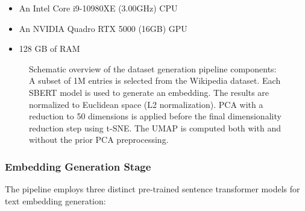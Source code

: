 \begin{itemize}
    \item An Intel Core i9-10980XE (3.00GHz) CPU
    \item An NVIDIA Quadro RTX 5000 (16GB) GPU
    \item 128 GB of RAM
\end{itemize}

\begin{figure}[!htb]
    \centering
    \caption{Schematic overview of the dataset generation pipeline components: A subset of 1M entries is selected from the Wikipedia dataset. Each SBERT model is used to generate an embedding. The results are normalized to Euclidean space (L2 normalization). PCA with a reduction to 50 dimensions is applied before the final dimensionality reduction step using t-SNE. The UMAP is computed both with and without the prior PCA preprocessing.}
    \label{fig:pipeline-overview}
\end{figure}

\subsubsection{Embedding Generation Stage}
\label{sec:embed-gen}

The pipeline employs three distinct pre-trained sentence transformer models for text embedding generation:

